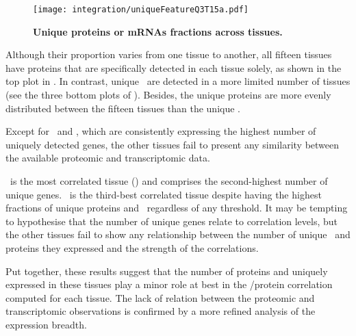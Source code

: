 \begin{figure}[!htb]
    \texttt{[image: integration/uniqueFeatureQ3T15a.pdf]}\centering
    \vspace{-5mm}
    \caption[Unique proteins or mRNAs fractions across tissues]{\label{fig:UniqueFeatureQ3T15}
    \textbf{Unique proteins or mRNAs fractions across tissues.}
    }
\end{figure}

Although their proportion varies from one tissue to another,
all fifteen tissues have proteins
that are specifically detected in each tissue solely,
as shown in the top plot in .
In contrast, unique \mRNAs\ are detected in a more limited number of tissues
(see the three bottom plots of ).
Besides, the unique proteins are more evenly distributed
between the fifteen tissues than the unique \mRNAs.\mybr\

Except for \Testis\ and \Liver,
which are consistently expressing the highest number of uniquely detected genes,
the other tissues fail to present any similarity
between the available proteomic and transcriptomic data.\mybr\

\Liver\ is the most correlated tissue ()
and comprises the second-highest number of unique genes.
\Testis\ is the third-best correlated tissue
despite having the highest fractions of unique proteins and \mRNAs\
regardless of any threshold.
It may be tempting to hypothesise that the number of unique genes
relate to correlation levels,
but the other tissues fail to show any relationship
between the number of unique \mRNAs\ and proteins they expressed
and the strength of the correlations.\mybr\

Put together, these results suggest that
the number of proteins and \mRNAs{} uniquely expressed in these tissues
play a minor role at best in the \mRNA/protein correlation computed for each tissue.
The lack of relation between the proteomic and transcriptomic observations
is confirmed by a more refined analysis of the expression breadth.\mybr\

